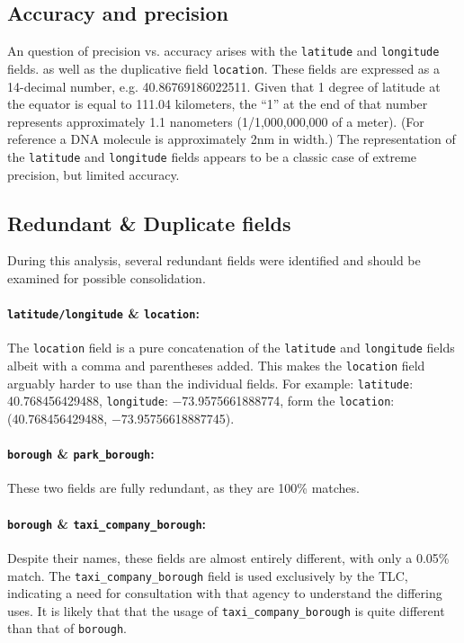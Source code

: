 \documentclass[linenumber]{jdsart}
\begin{document}
\subsection{Accuracy and precision}
\label{sec:precision}
An question of precision vs. accuracy arises with the \texttt{latitude} 
and \texttt{longitude} fields. as well as the duplicative 
field \texttt{location}. These fields are expressed as 
a 14\mbox{-}decimal number, e.g. 40.86769186022511. Given 
that 1 degree of latitude at the equator is equal to 111.04 
kilometers, the ``1'' at the end of that number represents 
approximately 1.1 nanometers (1/1,000,000,000 of a meter). (For 
reference a DNA molecule is approximately 2nm in width.) The 
representation of the \texttt{latitude} and \texttt{longitude} fields
appears to be a classic case of extreme precision, but limited accuracy. 


\subsection{Redundant \& Duplicate fields}
\label{sec:duplicates}
During this analysis, several redundant fields were identified and should 
be examined for possible consolidation.

\paragraph{\texttt{latitude/longitude} \& \texttt{location}:} 
The \texttt{location} field is a pure concatenation of 
the \texttt{latitude} and \texttt{longitude} fields albeit with a 
comma and parentheses added. This makes the \texttt{location} field 
arguably harder to use than the individual fields. For example:  
\texttt{latitude}: 40.768456429488, \texttt{longitude}: $-$73.9575661888774, 
form the \texttt{location}: (40.768456429488, $-$73.95756618887745).

\paragraph{\texttt{borough} \& \texttt{park\_borough}:} These two fields are fully redundant, 
as they are 100\% matches.

\paragraph{\texttt{borough} \& \texttt{taxi\_company\_borough}:} Despite 
their names, these fields are almost entirely different, with only 
a 0.05\% match. The \texttt{taxi\_company\_borough} field is 
used exclusively by the TLC, indicating a need for consultation 
with that agency to understand the differing uses. It is 
likely that that the usage of \texttt{taxi\_company\_borough} is 
quite different than that of \texttt{borough}. 
\end{document}
